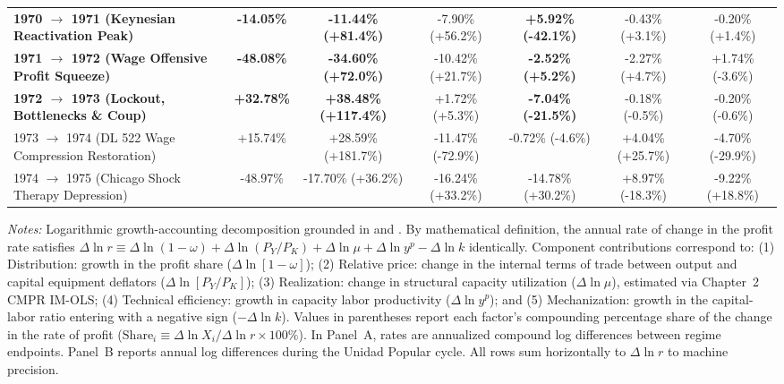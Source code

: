 \begin{table}[htbp]
{\begin{tabular}{lcccccc}
\textbf{1970 $\to$ 1971 (Keynesian Reactivation Peak)} & \textbf{-14.05\%} & \textbf{-11.44\% (+81.4\%)} & -7.90\% (+56.2\%) & \textbf{+5.92\% (-42.1\%)} & -0.43\% (+3.1\%) & -0.20\% (+1.4\%) \\
\textbf{1971 $\to$ 1972 (Wage Offensive Profit Squeeze)} & \textbf{-48.08\%} & \textbf{-34.60\% (+72.0\%)} & -10.42\% (+21.7\%) & \textbf{-2.52\% (+5.2\%)} & -2.27\% (+4.7\%) & +1.74\% (-3.6\%) \\
\textbf{1972 $\to$ 1973 (Lockout, Bottlenecks \& Coup)} & \textbf{+32.78\%} & \textbf{+38.48\% (+117.4\%)} & +1.72\% (+5.3\%) & \textbf{-7.04\% (-21.5\%)} & -0.18\% (-0.5\%) & -0.20\% (-0.6\%) \\
1973 $\to$ 1974 (DL 522 Wage Compression Restoration) & +15.74\% & +28.59\% (+181.7\%) & -11.47\% (-72.9\%) & -0.72\% (-4.6\%) & +4.04\% (+25.7\%) & -4.70\% (-29.9\%) \\
1974 $\to$ 1975 (Chicago Shock Therapy Depression) & -48.97\% & -17.70\% (+36.2\%) & -16.24\% (+33.2\%) & -14.78\% (+30.2\%) & +8.97\% (-18.3\%) & -9.22\% (+18.8\%) \\
\bottomrule
\end{tabular}%
}
\begin{minipage}{0.98\textwidth}
\vspace{0.4em}
\footnotesize
\textit{Notes:} Logarithmic growth-accounting decomposition grounded in \citet[Section 6.1, Eqs.~28--31]{Basu2017} and \citet{Weisskopf1978,Weisskopf1979}. By mathematical definition, the annual rate of change in the profit rate satisfies $\Delta \ln r \equiv \Delta \ln(1 - \omega) + \Delta \ln(P_Y / P_K) + \Delta \ln \mu + \Delta \ln y^p - \Delta \ln k$ identically. Component contributions correspond to: (1) Distribution: growth in the profit share ($\Delta \ln[1 - \omega]$); (2) Relative price: change in the internal terms of trade between output and capital equipment deflators ($\Delta \ln[P_Y / P_K]$); (3) Realization: change in structural capacity utilization ($\Delta \ln \mu$), estimated via Chapter~2 CMPR IM-OLS; (4) Technical efficiency: growth in capacity labor productivity ($\Delta \ln y^p$); and (5) Mechanization: growth in the capital-labor ratio entering with a negative sign ($-\Delta \ln k$). Values in parentheses report each factor's compounding percentage share of the change in the rate of profit ($\text{Share}_i \equiv \Delta \ln X_i / \Delta \ln r \times 100\%$). In Panel~A, rates are annualized compound log differences between regime endpoints. Panel~B reports annual log differences during the Unidad Popular cycle. All rows sum horizontally to $\Delta \ln r$ to machine precision.
\end{minipage}
\end{table}

